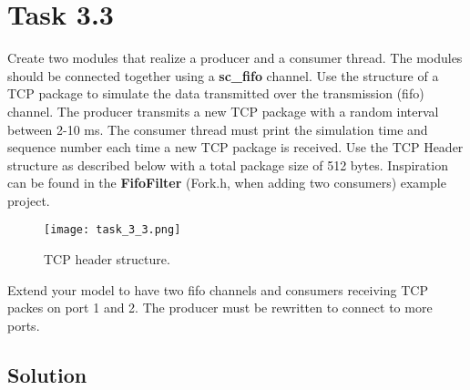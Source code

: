 \documentclass[../main.tex]{subfiles}
\begin{document}
\section{Task 3.3}

Create two modules that realize a producer and a consumer thread. The modules should be connected together using a \textbf{sc\_fifo} channel. Use the structure of a TCP package to simulate the data transmitted over the transmission (fifo) channel. The producer transmits a new TCP package with a random interval between 2-10 ms. The consumer thread must print the simulation time and sequence number each time a new TCP package is received. Use the TCP Header structure as described below with a total package size of 512 bytes. Inspiration can be found in the \textbf{FifoFilter} (Fork.h, when adding two consumers) example project.


\begin{figure}[h]
    \centering
    \texttt{[image: task\_3\_3.png]}
    \caption{TCP header structure.}
    \label{fig:tcp}
\end{figure}

Extend your model to have two fifo channels and consumers receiving TCP packes on port 1 and 2. The producer must be rewritten to connect to more ports.

\subsection*{Solution}
\end{document}
